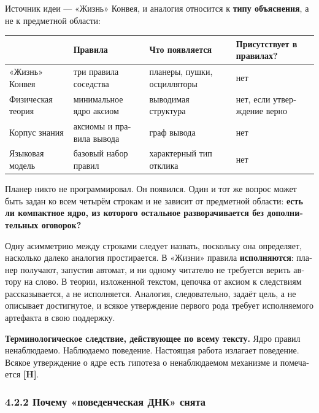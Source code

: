 \begin{russian}
Источник идеи — «Жизнь» Конвея, и аналогия относится к \textbf{типу объяснения}, а не к предметной области:

\begin{center}
\small
\begin{tabularx}{\linewidth}{>{\raggedright\arraybackslash}X>{\raggedright\arraybackslash}X>{\raggedright\arraybackslash}X>{\raggedright\arraybackslash}X}
\toprule
 & \textbf{Правила} & \textbf{Что появляется} & \textbf{Присутствует в правилах?} \\
\midrule
«Жизнь» Конвея & три правила соседства & планеры, пушки, осцилляторы & нет \\
Физическая теория & минимальное ядро аксиом & выводимая структура & нет, если утверждение верно \\
Корпус знания & аксиомы и правила вывода & граф вывода & нет \\
Языковая модель & базовый набор правил & характерный тип отклика & нет \\
\bottomrule
\end{tabularx}
\end{center}
Планер никто не программировал. Он появился. Один и тот же вопрос может быть задан ко всем четырём строкам и не зависит от предметной области: \textbf{есть ли компактное ядро, из которого остальное разворачивается без дополнительных оговорок?}

Одну асимметрию между строками следует назвать, поскольку она определяет, насколько далеко аналогия простирается. В «Жизни» правила \textbf{исполняются}: планер получают, запустив автомат, и ни одному читателю не требуется верить автору на слово. В теории, изложенной текстом, цепочка от аксиом к следствиям рассказывается, а не исполняется. Аналогия, следовательно, задаёт цель, а не описывает достигнутое, и всякое утверждение первого рода требует исполняемого артефакта в свою поддержку.

\textbf{Терминологическое следствие, действующее по всему тексту.} Ядро правил ненаблюдаемо. Наблюдаемо поведение. Настоящая работа излагает поведение. Всякое утверждение о ядре есть гипотеза о ненаблюдаемом механизме и помечается \textbf{[H]}.


\subsubsection*{4.2.2 Почему «поведенческая ДНК» снята}
\label{sec:ru:4.2.2}


\end{russian}
